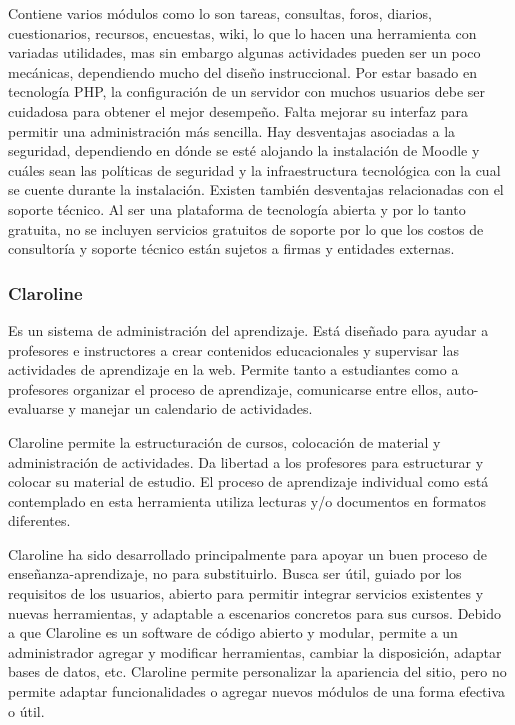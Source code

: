 \documentclass[letterpaper, 11pt, oneside]{article}
\theoremstyle{definition}
\theoremstyle{remark}
\begin{document}
Contiene varios módulos como lo son tareas, consultas, foros, diarios, cuestionarios, recursos, encuestas, wiki, lo que lo hacen una herramienta con variadas utilidades, mas sin embargo algunas actividades pueden ser un poco mecánicas, dependiendo mucho del diseño instruccional. Por estar basado en tecnología PHP, la configuración de un servidor con muchos usuarios debe ser cuidadosa para obtener el mejor desempeño. Falta mejorar su interfaz para permitir una administración más sencilla. Hay desventajas asociadas a la seguridad, dependiendo en dónde se esté alojando la instalación de Moodle y cuáles sean las políticas de seguridad y la infraestructura tecnológica con la cual se cuente durante la instalación.
Existen también desventajas relacionadas con el soporte técnico. Al ser una plataforma de tecnología abierta y por lo tanto gratuita, no se incluyen servicios gratuitos de soporte por lo que los costos de consultoría y soporte técnico están sujetos a firmas y entidades externas.

\subsubsection{Claroline} \cite{CLAROLINE} \cite{Sampedro} Es un sistema de administración del aprendizaje. Está diseñado para ayudar a profesores e instructores a crear contenidos educacionales y supervisar las actividades de aprendizaje en la web. Permite tanto a estudiantes como a profesores organizar el proceso de aprendizaje, comunicarse entre ellos, auto-evaluarse y manejar un calendario de actividades.

Claroline permite la estructuración de cursos, colocación de material y administración de actividades. Da libertad a los profesores para estructurar y colocar su material de estudio. El proceso de aprendizaje individual como está contemplado en esta herramienta utiliza lecturas y/o documentos en formatos diferentes.

Claroline ha sido desarrollado principalmente para apoyar un buen proceso de enseñanza-aprendizaje, no para substituirlo. Busca ser útil, guiado por los requisitos de los usuarios, abierto para permitir integrar servicios existentes y nuevas herramientas, y adaptable a escenarios concretos para sus cursos. Debido a que Claroline es un software de código abierto y modular, permite a un administrador agregar y modificar herramientas, cambiar la disposición, adaptar bases de datos, etc. Claroline permite personalizar la apariencia del sitio, pero no permite adaptar funcionalidades o agregar nuevos módulos de una forma efectiva o útil.
\end{document}
